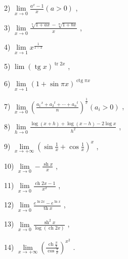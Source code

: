 2) $\mathop{\lim }\limits_{{x \rightarrow  0}}\frac{{a}^{x} - 1}{x}\left( {a > 0}\right)$ ,

3) $\mathop{\lim }\limits_{{x \rightarrow  0}}\frac{\sqrt[n]{1 + {ax}} - \sqrt[m]{1 + {bx}}}{x}$ ,

4) $\mathop{\lim }\limits_{{x \rightarrow  1}}{x}^{\frac{1}{1 - x}}$

5) $\lim {\left( \operatorname{tg}x\right) }^{\operatorname{tr}{2x}}$ ,

6) $\mathop{\lim }\limits_{{x \rightarrow  1}}{\left( 1 + \sin \pi x\right) }^{\operatorname{ctg}{\pi x}}$

7) $\mathop{\lim }\limits_{{x \rightarrow  0}}{\left( \frac{{a}_{1}{}^{x} + {a}_{2}{}^{t} + \cdots  + {a}_{n}{}^{t}}{n}\right) }^{\frac{1}{x}}\left( {{a}_{i} > 0}\right)$ ,

8) $\mathop{\lim }\limits_{{h \rightarrow  0}}\frac{\log \left( {x + h}\right)  + \log \left( {x - h}\right)  - 2\log x}{{h}^{2}}$ ,

9) $\mathop{\lim }\limits_{{x \rightarrow   + \infty }}{\left( \sin \frac{1}{x} + \cos \frac{1}{x}\right) }^{x}$ ,

10) $\mathop{\lim }\limits_{{x \rightarrow  0}} - \frac{\operatorname{sh}x}{x}$ ,

11) $\mathop{\lim }\limits_{{x \rightarrow  0}}\frac{\operatorname{ch}{2x} - 1}{{x}^{2}}$ ,

12) $\mathop{\lim }\limits_{{x \rightarrow  0}}\frac{{e}^{\ln {2x}} - {e}^{\ln x}}{\operatorname{th}x}$ ,

13) $\mathop{\lim }\limits_{{x \rightarrow  0}}\frac{{\operatorname{sh}}^{2}x}{\log \left( {\operatorname{ch}{2x}}\right) }$ ,

14) $\mathop{\lim }\limits_{{x \rightarrow   + \infty }}{\left( \frac{\operatorname{ch}\frac{\pi }{x}}{\cos \frac{\pi }{x}}\right) }^{{x}^{2}}$ .


